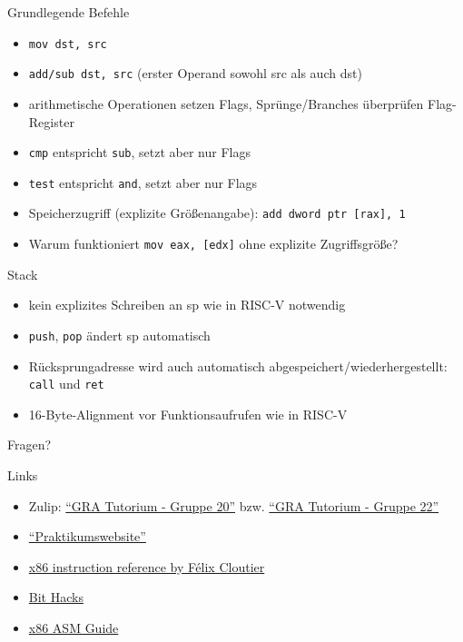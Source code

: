 \documentclass[
  german,            %
  aspectratio=169,    %
]{tumbeamer}
\begin{document}
\begin{frame}[c, fragile]{Grundlegende Befehle}{}
  \begin{itemize}
    \item \verb|mov dst, src|
    \item \verb|add/sub dst, src| (erster Operand sowohl src als auch dst)
    \item arithmetische Operationen setzen Flags, Sprünge/Branches überprüfen Flag-Register
    \item \verb|cmp| entspricht \verb|sub|, setzt aber nur Flags
    \item \verb|test| entspricht \verb|and|, setzt aber nur Flags
    \item Speicherzugriff (explizite Größenangabe): \verb|add dword ptr [rax], 1|
    \item Warum funktioniert \verb|mov eax, [edx]| ohne explizite Zugriffsgröße?
  \end{itemize}
\end{frame}

\begin{frame}[c, fragile]{Stack}{}
  \begin{itemize}
    \item kein explizites Schreiben an sp wie in RISC-V notwendig
    \item \verb|push|, \verb|pop| ändert sp automatisch
    \item Rücksprungadresse wird auch automatisch abgespeichert/wiederhergestellt: \verb|call| und \verb|ret|
    \item 16-Byte-Alignment vor Funktionsaufrufen wie in RISC-V
  \end{itemize}
\end{frame}

\begin{frame}[c]{}{}
  \begin{center}
    \LARGE Fragen?
  \end{center}
\end{frame}

\begin{frame}[fragile, c]{Links}{}
  \begin{itemize}
    \item Zulip: \href{https://zulip.in.tum.de/#narrow/stream/2267-GRA-Tutorium---Gruppe-20}{\enquote{GRA Tutorium - Gruppe 20}}
          bzw. \href{https://zulip.in.tum.de/#narrow/stream/2269-GRA-Tutorium---Gruppe-22}{\enquote{GRA Tutorium - Gruppe 22}}
    \item \href{https://gra.caps.in.tum.de}{\enquote{Praktikumswebsite}}
    \item \href{https://www.felixcloutier.com/x86/}{x86 instruction reference by Félix Cloutier}
    \item \href{https://graphics.stanford.edu/~seander/bithacks.html#CountBitsSetParallel}{Bit Hacks}
    \item \href{https://flint.cs.yale.edu/cs421/papers/x86-asm/asm.html}{x86 ASM Guide}
  \end{itemize}
\end{frame}

\maketitle
\end{document}
